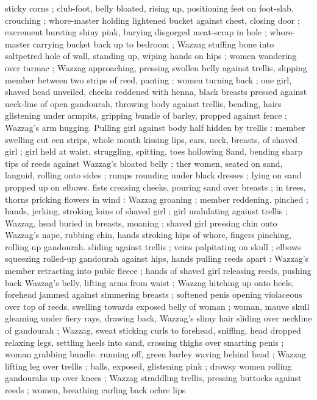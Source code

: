 {sticky corns ; club-foot, belly bloated, rising up, positioning feet on 
foot-slab, crouching ; whore-master holding lightened bucket against 
chest, closing door ; excrement bursting shiny pink, burying 
disgorged meat-scrap in hole ; whore-master carrying bucket back 
up to bedroom ; Wazzag stuffing bone into saltpetred hole of wall, 
standing up, wiping hands on hips ; women wandering over tarmac ; 
Wazzag approaching, pressing swollen belly against trellis, slipping 
member between two strips of reed, panting : women turning back ; 
one girl, shaved head unveiled, cheeks reddened with henna, black 
breasts pressed against neck-line of open gandourah, throwing body 
against trellis, bending, hairs glistening under armpits, gripping 
bundle of barley, propped against fence ; Wazzag's arm hugging. 
Pulling girl against body half hidden by trellis : member swelling cut 
een strips, whole mouth kissing lips, ears, neck, breasts, of 
shaved girl ; girl held at waist, struggling, spitting, toes hollowing 
Sand, bending sharp tips of reeds against Wazzag's bloated belly ; 
ther women, seated on sand, languid, rolling onto sides ; rumps 
rounding under black dresses ; lying on sand propped up on elbows. 
fists creasing cheeks, pouring sand over breasts ; in trees, thorns 
pricking flowers in wind : Wazzag groaning ; member reddening. 
pinched ; hands, jerking, stroking loins of shaved girl ; girl 
undulating against trellis ; Wazzag, head buried in breasts, moaning 
; shaved girl pressing chin onto Wazzag's nape, rubbing chin, hands 
stroking hips of whore, fingers pinching, rolling up gandourah. 
sliding against trellis ; veins palpitating on skull ; elbows squeezing 
rolled-up gandourah against hips, hands pulling reeds apart : 
Wazzag's member retracting into pubic fleece ; hands of shaved girl 
releasing reeds, pushing back Wazzag's belly, lifting arms from waist 
; Wazzag hitching up onto heels, forehead jammed against simmering 
breasts ; softened penis opening violaceous over top of reeds. 
swelling towards exposed belly of woman ; woman, mauve skull 
gleaming under fiery rays, drawing back, Wazzag's slimy hair sliding 
over neckline of gandourah ; Wazzag, sweat sticking curls to 
forehead, sniffing, head dropped relaxing legs, settling heels into 
sand, crossing thighs over smarting penis ; woman grabbing bundle. 
running off, green barley waving behind head ; Wazzag lifting leg 
over trellis ; balls, exposed, glistening pink ; drowsy women rolling 
gandourahs up over knees ; Wazzag straddling trellis, pressing 
buttocks against reeds ; women, breathing curling back ochre lips 
}
